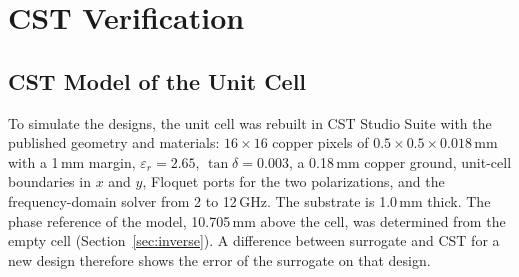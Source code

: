 \section{CST Verification}\label{sec:cst}

\subsection{CST Model of the Unit Cell}
To simulate the designs, the unit cell was rebuilt in CST Studio Suite with the published geometry and materials: $16\times16$ copper pixels of $0.5\times0.5\times0.018$\,mm with a 1\,mm margin, $\varepsilon_r=2.65$, $\tan\delta=0.003$, a 0.18\,mm copper ground, unit-cell boundaries in $x$ and $y$, Floquet ports for the two polarizations, and the frequency-domain solver from 2 to 12\,GHz. The substrate is 1.0\,mm thick. The phase reference of the model, 10.705\,mm above the cell, was determined from the empty cell (Section~\ref{sec:inverse}). A difference between surrogate and CST for a new design therefore shows the error of the surrogate on that design.

